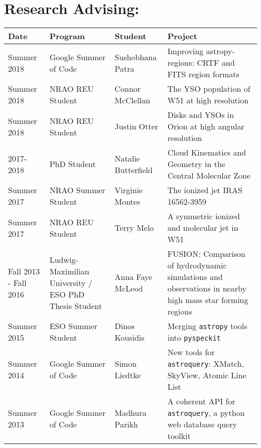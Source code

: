 \setlength{\extrarowheight}{4pt}
\section*{Research Advising: }
\vspace{-12pt}
\begin{tabular}{p{0.75in}p{1.3in}lp{2.6in}}
    Date  & Program & Student &  Project \\
    \hline
    Summer 2018 & Google Summer of Code &                                         Sushobhana Patra    &  Improving astropy-regions: CRTF and FITS region formats \\
    Summer 2018 & NRAO REU Student &                                              Connor McClellan    &  The YSO population of W51 at high resolution \\
    Summer 2018 & NRAO REU Student &                                              Justin Otter    &  Disks and YSOs in Orion at high angular resolution \\
    2017-2018 & PhD Student &                                                        Natalie Butterfield &  Cloud Kinematics and Geometry in the Central Molecular Zone \\
    Summer 2017 & NRAO Summer Student &                                              Virginie Montes    &  The ionized jet IRAS 16562-3959 \\
    Summer 2017 & NRAO REU Student &                                                 Terry Melo    &  A symmetric ionized and molecular jet in W51 \\
    Fall 2013 - Fall 2016 & Ludwig-Maximilian University / ESO PhD Thesis Student & Anna Faye McLeod &  FUSION: Comparison of hydrodynamic simulations and observations in nearby high mass star forming regions  \\
    Summer 2015 & ESO Summer Student &                                                 Dinos Kousidis    &  Merging \texttt{astropy} tools into \texttt{pyspeckit} \\
    Summer 2014 & Google Summer of Code &                                                 Simon Liedtke    &  New tools for \texttt{astroquery}: XMatch, SkyView, Atomic Line List \\
    Summer 2013 & Google Summer of Code &                                                 Madhura Parikh   &  A coherent API for \texttt{astroquery}, a python web database query toolkit \\
\end{tabular}

